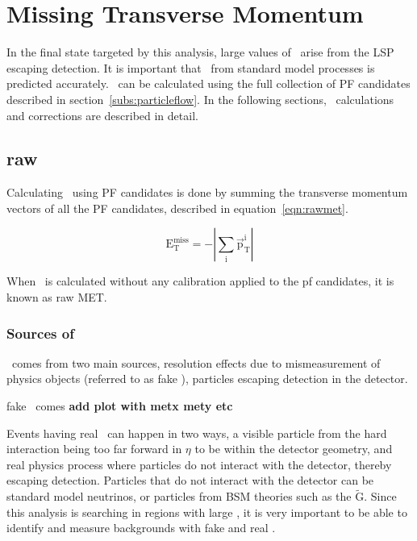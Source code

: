 \chapter{Missing Transverse Momentum}
\label{ch:MET}
In the final state targeted by this analysis, large values of \MET\ arise from the LSP escaping detection.
It is important that \MET\ from standard model processes is predicted accurately.
\MET\ can be calculated using the full collection of PF candidates described in section~\ref{subs:particleflow}.
In the following sections, \MET\ calculations and corrections are described in detail.

\section{raw \texorpdfstring{\MET}{MET}}

Calculating \MET\ using PF candidates is done by summing the transverse momentum vectors of all the PF candidates, described in equation~\ref{eqn:rawmet}.

\begin{equation}
  \label{eqn:rawmet}
\mathrm{E_{T}^{miss} = -|\sum_{i}\overrightarrow{p}_{T}^{i}|}
\end{equation}

When \MET\ is calculated without any calibration applied to the pf candidates, it is known as raw MET.

\subsection{Sources of \texorpdfstring{\MET}{MET}}
\label{sec:metsources}
\MET\ comes from two main sources,
resolution effects due to mismeasurement of physics objects (referred to as fake \MET),
particles escaping detection in the detector.

fake \MET\ comes {\bf add plot with metx mety etc}

Events having real \MET\ can happen in two ways,
a visible particle from the hard interaction being too far forward in $\eta$ to be within the detector geometry,
and real physics process where particles do not interact with the detector, thereby escaping detection.
Particles that do not interact with the detector can be standard model neutrinos, or particles from BSM theories such as the $\mathrm{\tilde{G}}$.
Since this analysis is searching in regions with large \MET, it is very important to be able to identify and measure backgrounds with fake \MET and real \MET.

